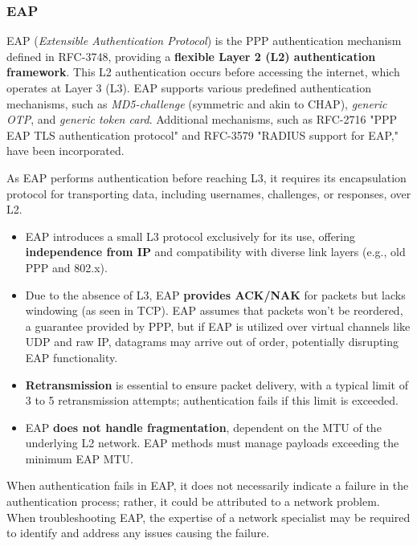 \subsubsection{EAP}
EAP (\textit{Extensible Authentication Protocol}) is the PPP authentication mechanism  defined in RFC-3748, providing a \textbf{flexible Layer 2 (L2) authentication framework}. This L2 authentication occurs before accessing the internet, which operates at Layer 3 (L3). EAP supports various predefined authentication mechanisms, such as \textit{MD5-challenge} (symmetric and akin to CHAP), \textit{generic OTP}, and \textit{generic token card}.
Additional mechanisms, such as RFC-2716 "PPP EAP TLS authentication protocol" and RFC-3579 "RADIUS support for EAP," have been incorporated.

As EAP performs authentication before reaching L3, it requires its encapsulation protocol for transporting data, including usernames, challenges, or responses, over L2.

\begin{itemize}
	\item EAP introduces a small L3 protocol exclusively for its use, offering \textbf{independence from IP} and compatibility with diverse link layers (e.g., old PPP and 802.x).
	\item Due to the absence of L3, EAP \textbf{provides ACK/NAK} for packets but lacks windowing (as seen in TCP). EAP assumes that packets won't be reordered, a guarantee provided by PPP, but if EAP is utilized over virtual channels like UDP and raw IP, datagrams may arrive out of order, potentially disrupting EAP functionality.
	\item \textbf{Retransmission} is essential to ensure packet delivery, with a typical limit of 3 to 5 retransmission attempts; authentication fails if this limit is exceeded.
	\item EAP \textbf{does not handle fragmentation}, dependent on the MTU of the underlying L2 network. EAP methods must manage payloads exceeding the minimum EAP MTU.
\end{itemize}


When authentication fails in EAP, it does not necessarily indicate a failure in the authentication process; rather, it could be attributed to a network problem. When troubleshooting EAP, the expertise of a network specialist may be required to identify and address any issues causing the failure.

